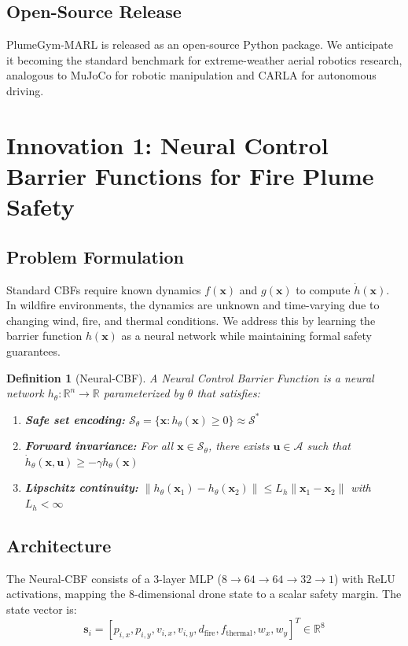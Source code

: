 \documentclass[12pt,a4paper]{article}
\DeclareRobustCommand{\cA}{\mathcal{A}}
\DeclareRobustCommand{\cS}{\mathcal{S}}
\DeclareRobustCommand{\R}{\mathbb{R}}
\DeclareRobustCommand{\vect}[1]{\bm{#1}}
\newtheorem{definition}[theorem]{Definition}
\begin{document}
\subsection{Open-Source Release}
PlumeGym-MARL is released as an open-source Python package. We anticipate it becoming the standard benchmark for extreme-weather aerial robotics research, analogous to MuJoCo for robotic manipulation and CARLA for autonomous driving.


\section{Innovation 1: Neural Control Barrier Functions for Fire Plume Safety}
\label{sec:neural_cbf}

\subsection{Problem Formulation}

Standard CBFs require known dynamics $f(\vect{x})$ and $g(\vect{x})$ to compute $\dot{h}(\vect{x})$. In wildfire environments, the dynamics are unknown and time-varying due to changing wind, fire, and thermal conditions. We address this by learning the barrier function $h(\vect{x})$ as a neural network while maintaining formal safety guarantees.

\begin{definition}[Neural-CBF]
\label{def:ncbf}
A Neural Control Barrier Function is a neural network $h_\theta : \R^n \to \R$ parameterized by $\theta$ that satisfies:
\begin{enumerate}[leftmargin=*]
    \item \textbf{Safe set encoding:} $\cS_\theta = \{\vect{x} : h_\theta(\vect{x}) \geq 0\} \approx \cS^*$
    \item \textbf{Forward invariance:} For all $\vect{x} \in \cS_\theta$, there exists $\vect{u} \in \cA$ such that $\dot{h}_\theta(\vect{x}, \vect{u}) \geq -\gamma h_\theta(\vect{x})$
    \item \textbf{Lipschitz continuity:} $\|h_\theta(\vect{x}_1) - h_\theta(\vect{x}_2)\| \leq L_h \|\vect{x}_1 - \vect{x}_2\|$ with $L_h < \infty$
\end{enumerate}
\end{definition}

\subsection{Architecture}
The Neural-CBF consists of a 3-layer MLP ($8 \to 64 \to 64 \to 32 \to 1$) with ReLU activations, mapping the 8-dimensional drone state to a scalar safety margin. The state vector is:
\begin{equation}
    \vect{s}_i = [p_{i,x}, p_{i,y}, v_{i,x}, v_{i,y}, d_{\text{fire}}, f_{\text{thermal}}, w_x, w_y]^T \in \R^8
\end{equation}
\end{document}
